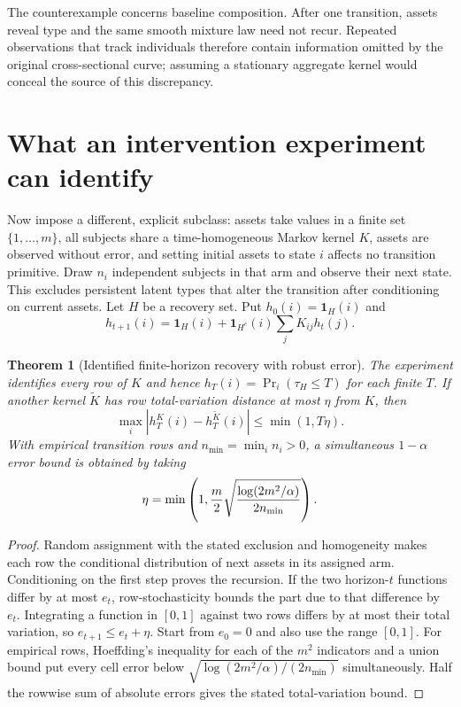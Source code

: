 \documentclass[11pt]{article}
\newtheorem{theorem}{Theorem}
\theoremstyle{definition}
\begin{document}
The counterexample concerns baseline composition. After one transition,
assets reveal type and the same smooth mixture law need not recur. Repeated
observations that track individuals therefore contain information omitted
by the original cross-sectional curve; assuming a stationary aggregate
kernel would conceal the source of this discrepancy.

\section*{What an intervention experiment can identify}
Now impose a different, explicit subclass: assets take values in a finite
set $\{1,\ldots,m\}$, all subjects share a time-homogeneous Markov kernel
$K$, assets are observed without error, and setting initial assets to state
$i$ affects no transition primitive. Draw $n_i$ independent subjects in
that arm and observe their next state. This excludes persistent latent
types that alter the transition after conditioning on current assets.
Let $H$ be a recovery set. Put $h_0(i)=\mathbf1_H(i)$ and
\[
 h_{t+1}(i)=\mathbf1_H(i)+\mathbf1_{H^c}(i)\sum_jK_{ij}h_t(j).
\]
\begin{theorem}[Identified finite-horizon recovery with robust error]
The experiment identifies every row of $K$ and hence
$h_T(i)=\Pr_i(\tau_H\le T)$ for each finite $T$. If another kernel
$\widetilde K$ has row total-variation distance at most $\eta$ from $K$,
then
\[
 \max_i|h_T^K(i)-h_T^{\widetilde K}(i)|\le\min(1,T\eta).
\]
With empirical transition rows and $n_{\min}=\min_i n_i>0$, a simultaneous
$1-\alpha$ error bound is obtained by taking
\[
 \eta=\min\left(1,{m\over2}\sqrt{\log(2m^2/\alpha)\over2n_{\min}}\right).
\]
\end{theorem}
\begin{proof}
Random assignment with the stated exclusion and homogeneity makes each
row the conditional distribution of next assets in its assigned arm.
Conditioning on the first step proves the recursion. If the two horizon-$t$
functions differ by at most $e_t$, row-stochasticity bounds the part due to
that difference by $e_t$. Integrating a function in $[0,1]$ against two
rows differs by at most their total variation, so $e_{t+1}\le e_t+\eta$.
Start from $e_0=0$ and also use the range $[0,1]$.
For empirical rows, Hoeffding's inequality for each of the $m^2$ indicators
and a union bound put every cell error below
$\sqrt{\log(2m^2/\alpha)/(2n_{\min})}$ simultaneously. Half the rowwise
sum of absolute errors gives the stated total-variation bound.
\end{proof}
\end{document}

